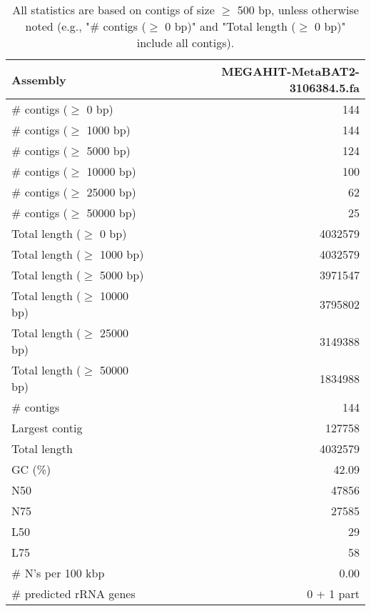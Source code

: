 \documentclass[12pt,a4paper]{article}
\begin{document}
\begin{table}[ht]
\begin{center}
\caption{All statistics are based on contigs of size $\geq$ 500 bp, unless otherwise noted (e.g., "\# contigs ($\geq$ 0 bp)" and "Total length ($\geq$ 0 bp)" include all contigs).}
\begin{tabular}{|l*{1}{|r}|}
\hline
Assembly & MEGAHIT-MetaBAT2-3106384.5.fa \\ \hline
\# contigs ($\geq$ 0 bp) & 144 \\ \hline
\# contigs ($\geq$ 1000 bp) & 144 \\ \hline
\# contigs ($\geq$ 5000 bp) & 124 \\ \hline
\# contigs ($\geq$ 10000 bp) & 100 \\ \hline
\# contigs ($\geq$ 25000 bp) & 62 \\ \hline
\# contigs ($\geq$ 50000 bp) & 25 \\ \hline
Total length ($\geq$ 0 bp) & 4032579 \\ \hline
Total length ($\geq$ 1000 bp) & 4032579 \\ \hline
Total length ($\geq$ 5000 bp) & 3971547 \\ \hline
Total length ($\geq$ 10000 bp) & 3795802 \\ \hline
Total length ($\geq$ 25000 bp) & 3149388 \\ \hline
Total length ($\geq$ 50000 bp) & 1834988 \\ \hline
\# contigs & 144 \\ \hline
Largest contig & 127758 \\ \hline
Total length & 4032579 \\ \hline
GC (\%) & 42.09 \\ \hline
N50 & 47856 \\ \hline
N75 & 27585 \\ \hline
L50 & 29 \\ \hline
L75 & 58 \\ \hline
\# N's per 100 kbp & 0.00 \\ \hline
\# predicted rRNA genes & 0 + 1 part \\ \hline
\end{tabular}
\end{center}
\end{table}
\end{document}
